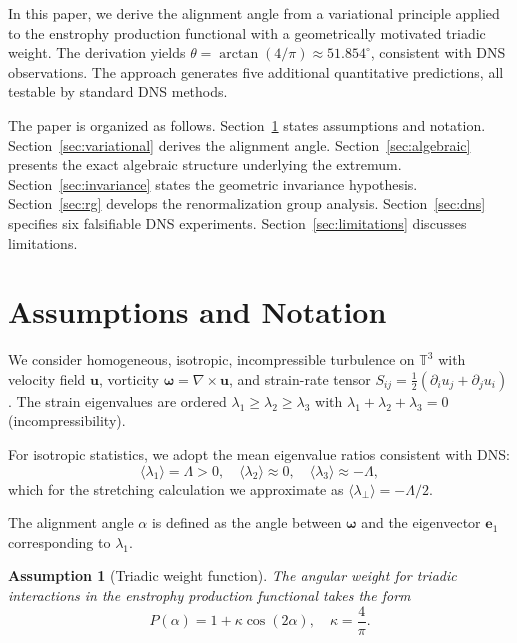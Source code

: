 \documentclass[12pt,a4paper]{article}
\newtheorem{assumption}{Assumption}
\begin{document}
In this paper, we derive the alignment angle from a variational principle applied to the enstrophy production functional with a geometrically motivated triadic weight.
The derivation yields $\theta = \arctan(4/\pi) \approx 51.854^\circ$, consistent with DNS observations.
The approach generates five additional quantitative predictions, all testable by standard DNS methods.

The paper is organized as follows.
Section~\ref{sec:setup} states assumptions and notation.
Section~\ref{sec:variational} derives the alignment angle.
Section~\ref{sec:algebraic} presents the exact algebraic structure underlying the extremum.
Section~\ref{sec:invariance} states the geometric invariance hypothesis.
Section~\ref{sec:rg} develops the renormalization group analysis.
Section~\ref{sec:dns} specifies six falsifiable DNS experiments.
Section~\ref{sec:limitations} discusses limitations.

\section{Assumptions and Notation}
\label{sec:setup}

We consider homogeneous, isotropic, incompressible turbulence on $\mathbb{T}^3$ with velocity field $\bm{u}$, vorticity $\bm{\omega} = \nabla \times \bm{u}$, and strain-rate tensor $S_{ij} = \tfrac{1}{2}(\partial_i u_j + \partial_j u_i)$.
The strain eigenvalues are ordered $\lambda_1 \geq \lambda_2 \geq \lambda_3$ with $\lambda_1 + \lambda_2 + \lambda_3 = 0$ (incompressibility).

For isotropic statistics, we adopt the mean eigenvalue ratios consistent with DNS:
\begin{equation}
\langle\lambda_1\rangle = \Lambda > 0, \quad \langle\lambda_2\rangle \approx 0, \quad \langle\lambda_3\rangle \approx -\Lambda,
\end{equation}
which for the stretching calculation we approximate as $\langle\lambda_\perp\rangle = -\Lambda/2$.

The alignment angle $\alpha$ is defined as the angle between $\bm{\omega}$ and the eigenvector $\bm{e}_1$ corresponding to $\lambda_1$.

\begin{assumption}[Triadic weight function]
\label{ass:triadic}
The angular weight for triadic interactions in the enstrophy production functional takes the form
\begin{equation}
\label{eq:Palpha}
P(\alpha) = 1 + \kappa \cos(2\alpha), \quad \kappa = \frac{4}{\pi}.
\end{equation}
\end{assumption}
\end{document}
